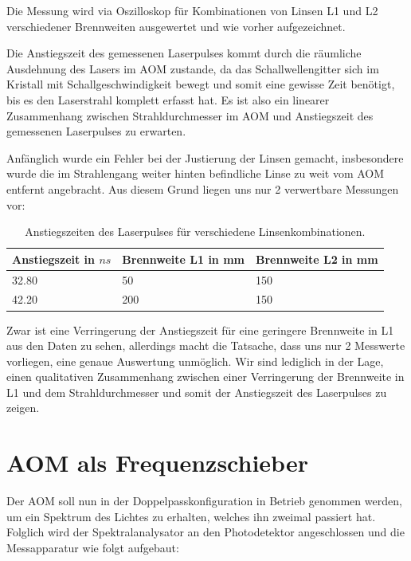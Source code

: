 \documentclass[bigchapter,colorback,accentcolor=tud4b,linedtoc,11pt]{tudreport}
\begin{document}
Die Messung wird via Oszilloskop für Kombinationen von Linsen L1 und L2 verschiedener Brennweiten ausgewertet und wie vorher aufgezeichnet.

Die Anstiegszeit des gemessenen Laserpulses kommt durch die räumliche Ausdehnung des Lasers im AOM zustande, da das Schallwellengitter sich im Kristall mit Schallgeschwindigkeit bewegt und somit eine gewisse Zeit benötigt, bis es den Laserstrahl komplett erfasst hat. Es ist also ein linearer Zusammenhang zwischen Strahldurchmesser im AOM und Anstiegszeit des gemessenen Laserpulses zu erwarten.

Anfänglich wurde ein Fehler bei der Justierung der Linsen gemacht, insbesondere wurde die im Strahlengang weiter hinten befindliche Linse zu weit vom AOM entfernt angebracht. Aus diesem Grund liegen uns nur 2 verwertbare Messungen vor:

\begin{table}[H]
  \begin{center}
    \begin{tabular}{|p{5cm}|p{4cm}|p{4.5cm}|}
      \hline
          Anstiegszeit in $ns$ & Brennweite L1 in mm & Brennweite L2 in mm \\ \hline
          32.80                & 50                  & 150                 \\ \hline
          42.20                & 200                 & 150                 \\ \hline
    \end{tabular}
  \end{center}
  \caption{Anstiegszeiten des Laserpulses für verschiedene Linsenkombinationen. }
\end{table}
\FloatBarrier

Zwar ist eine Verringerung der Anstiegszeit für eine geringere Brennweite in L1 aus den Daten zu sehen, allerdings macht die Tatsache, dass uns nur 2 Messwerte vorliegen, eine genaue Auswertung unmöglich. Wir sind lediglich in der Lage, einen qualitativen Zusammenhang zwischen einer Verringerung der Brennweite in L1 und dem Strahldurchmesser und somit der Anstiegszeit des Laserpulses zu zeigen.

\section{AOM als Frequenzschieber}

Der AOM soll nun in der Doppelpasskonfiguration in Betrieb genommen werden, um ein Spektrum des Lichtes zu erhalten, welches ihn zweimal passiert hat. Folglich wird der Spektralanalysator an den Photodetektor angeschlossen und die Messapparatur wie folgt aufgebaut: 
\end{document}
